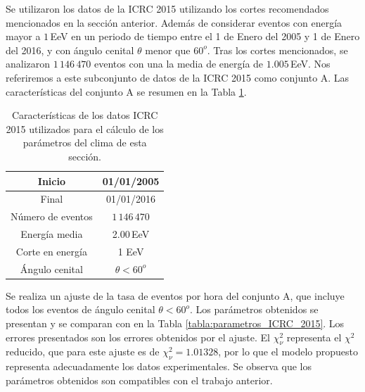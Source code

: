 Se utilizaron los datos de la ICRC 2015 utilizando los cortes recomendados mencionados en la sección anterior. Además de considerar eventos con energía mayor a $1\,$EeV en un periodo de tiempo entre el 1 de Enero del 2005 y 1 de Enero del 2016, y con ángulo cenital $\theta$ menor que $60^o$.  Tras los cortes mencionados, se analizaron $1\,146\,470$ eventos con una la media de energía de $1.005\,$EeV. Nos referiremos a este subconjunto de datos de la ICRC 2015  como conjunto A. Las características del conjunto A se resumen en la Tabla \ref{tabla:caracteristicas_ICRC_2015}.
        \begin{table}[H]
            \centering
            \begin{tabular}{|c|c|}
            \hline
            Inicio              & 01/01/2005 \\ \hline
            Final               & 01/01/2016  \\ \hline
            Número de eventos   & $1\,146\,470$ \\ \hline 
            Energía media       & 2.00\,EeV    				\\ \hline 
            Corte en energía    & 1 EeV        				\\ \hline 
            Ángulo cenital		& $\theta < 60^o$ 				\\ \hline
            \end{tabular}
        \caption{Características de los datos ICRC 2015 utilizados para el cálculo de los parámetros del clima de esta sección. } \label{tabla:caracteristicas_ICRC_2015}
        \end{table}

        Se realiza un ajuste de la tasa de eventos por hora del conjunto A, que incluye todos los eventos de ángulo cenital $\theta< 60^o$. Los parámetros obtenidos se presentan y se comparan con \cite{aab2017impact} en la Tabla \ref{tabla:parametros_ICRC_2015}. Los errores presentados son los errores obtenidos por el ajuste. El $\chi^2_\nu$ representa el $\chi^2$ reducido, que para este ajuste es de $\chi^2_\nu=1.01328$, por lo que el modelo propuesto representa adecuadamente los datos experimentales. Se observa que los parámetros obtenidos son compatibles con el trabajo anterior.

